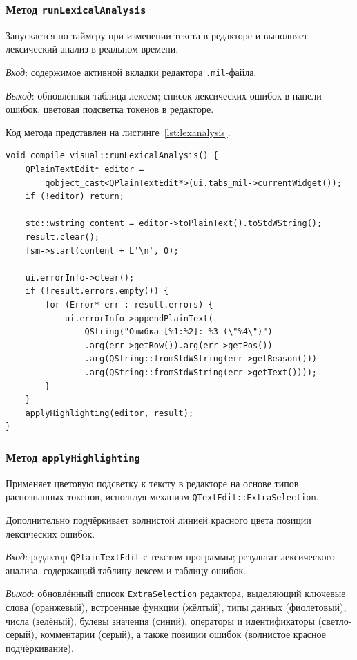\documentclass[a4paper,final]{article}
\begin{document}
\subsubsection*{Метод \texttt{runLexicalAnalysis}}

Запускается по таймеру при изменении текста в редакторе и выполняет
лексический анализ в реальном времени.

\textit{Вход}: содержимое активной вкладки редактора \texttt{.mil}-файла.

\textit{Выход}: обновлённая таблица лексем; список лексических ошибок
в панели ошибок; цветовая подсветка токенов в редакторе.

Код метода представлен на листинге~\ref{lst:lexanalysis}.

\begin{lstlisting}[caption={Метод compile\_visual::runLexicalAnalysis}, label=lst:lexanalysis]
void compile_visual::runLexicalAnalysis() {
    QPlainTextEdit* editor =
        qobject_cast<QPlainTextEdit*>(ui.tabs_mil->currentWidget());
    if (!editor) return;

    std::wstring content = editor->toPlainText().toStdWString();
    result.clear();
    fsm->start(content + L'\n', 0);

    ui.errorInfo->clear();
    if (!result.errors.empty()) {
        for (Error* err : result.errors) {
            ui.errorInfo->appendPlainText(
                QString("Ошибка [%1:%2]: %3 (\"%4\")")
                .arg(err->getRow()).arg(err->getPos())
                .arg(QString::fromStdWString(err->getReason()))
                .arg(QString::fromStdWString(err->getText())));
        }
    }
    applyHighlighting(editor, result);
}
\end{lstlisting}

\subsubsection*{Метод \texttt{applyHighlighting}}

Применяет цветовую подсветку к тексту в редакторе на основе типов
распознанных токенов, используя механизм \texttt{QTextEdit::ExtraSelection}.

Дополнительно подчёркивает волнистой линией красного цвета позиции
лексических ошибок.

\textit{Вход}: редактор \texttt{QPlainTextEdit} с текстом программы;
результат лексического анализа, содержащий таблицу лексем и таблицу ошибок.

\textit{Выход}: обновлённый список \texttt{ExtraSelection} редактора,
выделяющий ключевые слова (оранжевый), встроенные функции (жёлтый),
типы данных (фиолетовый), числа (зелёный), булевы значения (синий),
операторы и идентификаторы (светло-серый), комментарии (серый),
а также позиции ошибок (волнистое красное подчёркивание).
\end{document}
